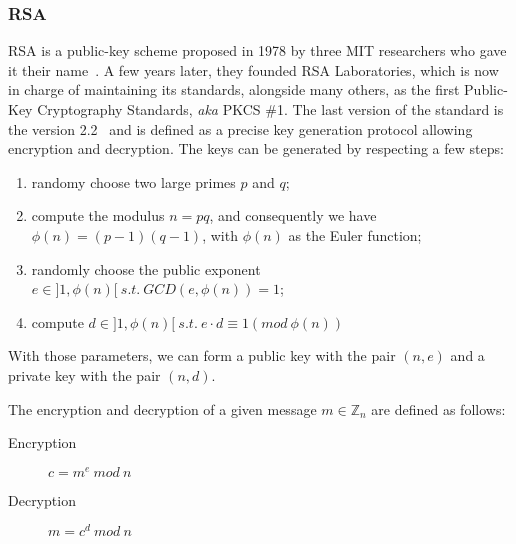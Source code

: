 \subsubsection{RSA}
RSA is a public-key scheme proposed in 1978 by three MIT researchers who gave it their name~\cite{Rivest:1978:MOD:359340.359342}.
A few years later, they founded RSA Laboratories, which is now in charge of maintaining its standards, alongside many others, as the first Public-Key Cryptography Standards, \textit{aka} PKCS \#1.
The last version of the standard is the version 2.2~\cite{pkcs1} and is defined as a precise key generation protocol allowing encryption and decryption.
The keys can be generated by respecting a few steps:
\begin{enumerate}
	\item randomy choose two large primes $p$ and $q$;
	\item compute the modulus $n = p q$, and consequently we have $\phi(n) = (p-1)(q-1)$, with $\phi(n)$ as the Euler function;
	\item randomly choose the public exponent $e \in ]1,\phi(n)[\ s.t.\ GCD(e,\phi(n)) = 1$;
	\item compute $d \in ]1,\phi(n)[\ s.t.\ e \cdot d \equiv 1 (mod\ \phi(n))$
\end{enumerate}

With those parameters, we can form a public key with the pair $(n, e)$ and a private key with the pair $(n, d)$.

The encryption and decryption of a given message $m \in \mathds{Z}_n$ are defined as follows:
\begin{description}
	\item[Encryption] $c = m^e\ mod\ n$
	\item[Decryption] $m = c^d\ mod\ n$
\end{description}




